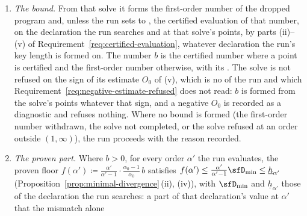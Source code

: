 \begin{requirement}
\begin{enumerate}[label=(\roman*),leftmargin=2.4em]
  which one is reported lies there, and that the orders a search evaluates
  and the lower end of its declared domain lie in $(1,2)$ is the bound the
  run tier places on the domain it accepts, which no claim of this contract
  states. On the
  declaration the run searches and with the run's
  acceptance set, it runs the first-order search of the
   for the 
  $\mathcal{D}_{\mathrm{all}}$ of every pair
  (Proposition~\ref{prop:minimal-divergence}) at $\alpha_0$, with the
  method, the iteration cap and the gap target the run applies to one
  evaluation of its own, and with the share
   of the wall budget of one
  evaluation of the run, where it has one, as its wall budget. A smaller
  share can leave a mismatch unproven: $b$ smaller, or not positive, so
  that (iv) may leave unrefused a run that a longer solve would have
  refused, and the
  cap of (iv) looser; no bound is made unsound by it.
\item \emph{The bound.} From that solve it forms the first-order number of
  the dropped program and, unless the run sets 
  to , the certified evaluation of that number, on the
  declaration the run searches and at that solve's points, by parts
  (ii)--(v) of Requirement~\ref{req:certified-evaluation}, whatever
  declaration the run's key length is formed on. The number $b$ is the
  certified number where a point is certified and the first-order number
  otherwise, with its . The solve is not refused on the sign of
  its estimate $O_0$ of (v), which is no  of the run and
  which Requirement~\ref{req:negative-estimate-refused} does not read: $b$
  is formed from the solve's points whatever that sign, and a negative
  $O_0$ is recorded as a diagnostic and refuses nothing. Where no bound is
  formed (the first-order number withdrawn, the solve not completed, or the
  solve refused at an order outside $(1,\infty)$), the run proceeds with
  the reason recorded.
\item \emph{The proven part.} Where $b>0$, for every order $\alpha'$ the run
  evaluates, the proven floor
  $f(\alpha')\coloneqq\frac{\alpha'}{\alpha'-1}\cdot
  \frac{\alpha_0-1}{\alpha_0}\,b$ satisfies
  $f(\alpha')\le\frac{\alpha'}{\alpha'-1}\sfD_{\min}\le\underline{h}_{\alpha'}$
  (Proposition~\ref{prop:minimal-divergence}\,(ii), (iv)), with $\sfD_{\min}$
  and $\underline{h}_{\alpha'}$ those of the declaration the run searches: a
  part of that declaration's value at $\alpha'$ that the mismatch alone

\end{enumerate}
\end{requirement}
